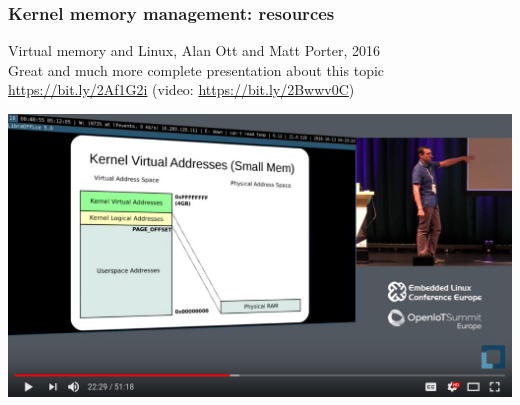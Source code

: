 \begin{frame}
  \frametitle{Kernel memory management: resources}
  Virtual memory and Linux, Alan Ott and Matt Porter, 2016\\
  Great and much more complete presentation about this topic\\
  \url{https://bit.ly/2Af1G2i} (video: \url{https://bit.ly/2Bwwv0C})
  \begin{center}
     \includegraphics[height=0.6\textheight]{slides/kernel-driver-development-memory/ott-porter-kernel-virtual-memory-presentation.jpg}
  \end{center}
\end{frame}

